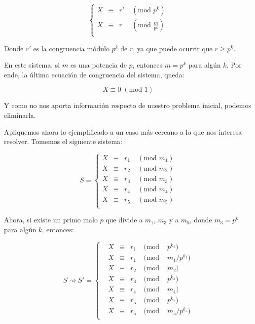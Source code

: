 \documentclass{article}
\newcommand{\nln}{\par\vspace{3mm}}
\begin{document}
\begin{equation*}
\left\{\begin{matrix}
X &\equiv &r' \; &(\text{mod } p^k)  \\
X &\equiv &r \; &(\text{mod } \frac{m}{p^k})  \\
\end{matrix}\right.
\end{equation*}

Donde $r'$ es la congruencia módulo $p^k$ de $r$, ya que puede ocurrir que $r \geqslant p^k$.
\nln

En este sistema, si $m$ es una potencia de $p$, entonces $m = p^k$ para algún $k$. Por ende, la última ecuación de congruencia del sistema, queda:

\begin{equation*}
    X \equiv 0 \; (\text{mod } 1)
\end{equation*}

Y como no nos aporta información respecto de nuestro problema inicial, podemos eliminarla.
\newpage

Apliquemos ahora lo ejemplificado a un caso más cercano a lo que nos interesa resolver. Tomemos el siguiente sistema:

\begin{equation*}
S = 
\left\{\begin{matrix}
 X &\equiv &r_1 \; &(\text{mod } m_1)  \\
 X &\equiv &r_2 \; &(\text{mod } m_2)  \\
 X &\equiv &r_3 \; &(\text{mod } m_3)  \\
 X &\equiv &r_4 \; &(\text{mod } m_4)  \\
 X &\equiv &r_5 \; &(\text{mod } m_5)  \\
\end{matrix}\right.
\end{equation*}
\nln

Ahora, si existe un primo malo $p$ que divide a $m_1$, $m_3$ y a $m_5$, donde $m_3 = p^k$ para algún $k$, entonces:

\begin{equation*}
S \rightsquigarrow S' =  
\left\{\begin{matrix}
 &X &\equiv &r_1 \; &(\text{mod } &{p^{k_1}})             \\
 &X &\equiv &r_1 \; &(\text{mod } &m_1 / p^{k_1})         \\
 &X &\equiv &r_2 \; &(\text{mod } &m_2)                   \\
 &X &\equiv &r_3 \; &(\text{mod } &p^{k_3})               \\
 &X &\equiv &r_4 \; &(\text{mod } &m_4)                   \\
 &X &\equiv &r_5 \; &(\text{mod } &p^{k_5})               \\
 &X &\equiv &r_5 \; &(\text{mod } &m_5 / p^{k_5})         \\
\end{matrix}\right.
\end{equation*}
\end{document}
